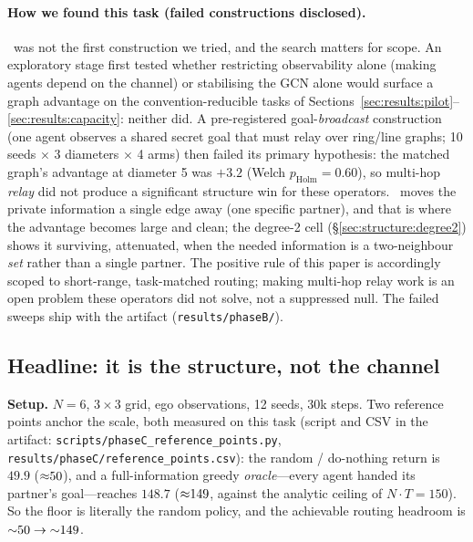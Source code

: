 \paragraph{How we found this task (failed constructions disclosed).}
\pairrouting\ was not the first construction we tried, and the search
matters for scope. An exploratory stage first tested whether restricting
observability alone (making agents depend on the channel) or stabilising the
GCN alone would surface a graph advantage on the convention-reducible tasks
of Sections~\ref{sec:results:pilot}--\ref{sec:results:capacity}: neither
did. A pre-registered goal-\emph{broadcast} construction (one agent observes
a shared secret goal that must relay over ring/line graphs; 10 seeds
$\times$ 3 diameters $\times$ 4 arms) then failed its primary hypothesis:
the matched graph's advantage at diameter 5 was $+3.2$ (Welch
$p_{\text{Holm}}=0.60$), so multi-hop \emph{relay} did not produce a
significant structure win for these operators. \pairrouting\ moves the
private information a single edge away (one specific partner), and that is
where the advantage becomes large and clean; the degree-2 cell
(\S\ref{sec:structure:degree2}) shows it surviving, attenuated, when the
needed information is a two-neighbour \emph{set} rather than a single
partner. The positive rule of this paper is accordingly scoped to
short-range, task-matched routing; making multi-hop relay work is an open
problem these operators did not solve, not a suppressed null. The failed
sweeps ship with the artifact (\texttt{results/phaseB/}).

\subsection{Headline: it is the structure, not the channel}
\label{sec:structure:headline}

\textbf{Setup.} $N{=}6$, $3{\times}3$ grid, ego observations, 12 seeds, 30k
steps. Two reference points anchor the scale, both measured on this task
(script and CSV in the artifact: \texttt{scripts/phaseC\_reference\_points.py},
\texttt{results/phaseC/reference\_points.csv}): the random / do-nothing
return is $49.9$ (${\approx}50$), and a full-information greedy
\emph{oracle}---every agent handed its partner's goal---reaches $148.7$
(${\approx}149$, against the analytic ceiling of $N \cdot T = 150$).
So the floor is literally the random
policy, and the achievable routing headroom is ${\sim}50\to{\sim}149$.

